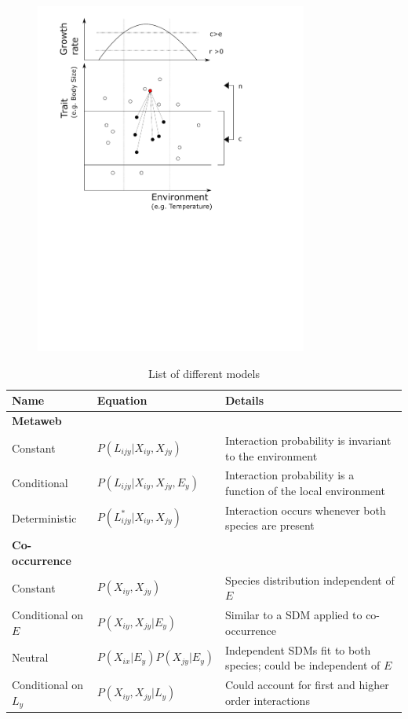 \documentclass[12pt]{article}
\begin{document}
\begin{figure}[ht!]
\centering\includegraphics[width=0.8\textwidth]{niche}
\end{figure}

\newpage


\begin{table}[c]
\centering
\begin{tabular}{p{4cm}p{4cm}p{6cm}}
\hline
Name & Equation & Details \\
\hline
\textbf{Metaweb} &  & \\
Constant & $P(L_{ijy}|X_{iy},X_{jy})$ & Interaction probability is invariant to the environment \\
Conditional & $P(L_{ijy}|X_{iy},X_{jy},E_y)$ & Interaction probability is a function of the local environment \\
Deterministic & $P(L^*_{ijy}|X_{iy},X_{jy})$ & Interaction occurs whenever both species are present \\

\textbf{Co-occurrence} & &\\
Constant & $P(X_{iy},X_{jy})$ & Species distribution independent of $E$ \\
Conditional on $E$ & $P(X_{iy},X_{jy} |E_y)$ & Similar to a SDM applied to co-occurrence \\
Neutral & $P(X_{ix}|E_y)P(X_{jy}|E_y)$ & Independent SDMs fit to both species; could be independent of $E$ \\
Conditional on $L_y$ & $P(X_{iy},X_{jy} | L_y)$ & Could account for first and higher order interactions \\
\hline
\end{tabular}
\caption{List of different models}
\end{table}
\end{document}
